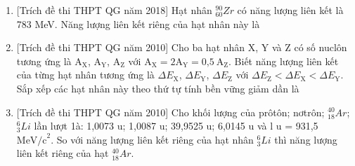 \begin{enumerate}
{		
	}
	\item{[Trích đề thi THPT QG năm 2018] Hạt nhân $^{90}_{60} Zr$ có năng lượng liên kết là 783 MeV. Năng lượng liên kết riêng của hạt nhân này là
	}
	\item{[Trích đề thi THPT QG năm 2010] Cho ba hạt nhân X, Y và Z có số nuclôn tương ứng là $\text{A}_{\text{X}}$, $\text{A}_{\text{Y}}$, $\text{A}_{\text{Z}}$ với $\text{A}_{\text{X}} = 2\text{A}_{\text{Y}} = \text{0,5}\ \text{A}_{\text{Z}}$. Biết năng lượng liên kết của từng hạt nhân tương ứng là $\Delta E_{\text{X}}$, $\Delta E_{\text{Y}}$, $\Delta E_{\text{Z}}$ với $\Delta E_{\text{Z}} < \Delta E_{\text{X}} < \Delta E_{\text{Y}}$. Sắp xếp các hạt nhân này theo thứ tự tính bền vững giảm dần là
	}
	\item{[Trích đề thi THPT QG năm 2010] Cho khối lượng của prôtôn; nơtrôn; $^{40}_{18} Ar$; $^6_3 Li$ lần lượt 1à: 1,0073 u; 1,0087 u; 39,9525 u; 6,0145 u và l u = 931,5 $\text{MeV/c}^2$. So với năng lượng liên kết riêng của hạt nhân $^6_3 Li$ thì năng lượng liên kết riêng của hạt $^{40}_{18} Ar$. 
	}
\end{enumerate}
